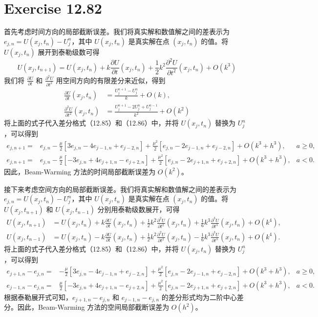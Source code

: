 \documentclass[twoside,a4paper]{article}
\begin{document}
\section{Exercise 12.82}
首先考虑时间方向的局部截断误差。我们将真实解和数值解之间的差表示为 $e_{j,n} = U(x_j, t_n) - U_j^n$，其中 $U(x_j, t_n)$ 是真实解在点 $(x_j, t_n)$ 的值。将 $U(x_j, t_n)$ 展开到泰勒级数可得
$$
U(x_j, t_{n+1}) = U(x_j, t_n) + k\frac{\partial U}{\partial t}(x_j,t_n) + \frac{1}{2}k^2\frac{\partial^2 U}{\partial t^2}(x_j, t_n) + O(k^3)
$$
我们将 $\frac{\partial U}{\partial t}$ 和 $\frac{\partial^2 U}{\partial t^2}$ 用空间方向的有限差分来近似，得到
$$
\begin{aligned}
\frac{\partial U}{\partial t}(x_j,t_n) &= \frac{U_{j}^{n+1} - U_{j}^{n}}{k} + O(k),\\
\frac{\partial^2 U}{\partial t^2}(x_j,t_n) &= \frac{U_{j}^{n+1} - 2U_j^n + U_j^{n-1}}{k^2} + O(k^2)
\end{aligned}
$$
将上面的式子代入差分格式（12.85）和（12.86）中，并将 $U(x_j, t_n)$ 替换为 $U_j^n$，可以得到
$$
\begin{aligned}
e_{j,n+1} =& e_{j,n} -\frac{\mu}{2}\left[3e_{j,n} - 4e_{j-1,n} + e_{j-2,n}\right] + \frac{\mu^2}{2}\left[e_{j,n} - 2e_{j-1,n} + e_{j-2,n}\right] + O(k^3 + h^3), & a\geq 0,\\
e_{j,n+1} =& e_{j,n} -\frac{\mu}{2}\left[-3e_{j,n} + 4e_{j+1,n} - e_{j+2,n}\right] + \frac{\mu^2}{2}\left[e_{j,n} - 2e_{j+1,n} + e_{j+2,n}\right] + O(k^3 + h^3), & a< 0.
\end{aligned}
$$
因此，Beam-Warming 方法的时间局部截断误差为 $O(k^2)$。

接下来考虑空间方向的局部截断误差。我们将真实解和数值解之间的差表示为 $e_{j,n} = U(x_j, t_n) - U_j^n$，其中 $U(x_j, t_n)$ 是真实解在点 $(x_j, t_n)$ 的值。将 $U(x_j, t_{n+1})$ 和 $U(x_j, t_{n-1})$ 分别用泰勒级数展开，可得
$$
\begin{aligned}
U(x_j, t_{n+1}) &= U(x_j, t_n) + k\frac{\partial U}{\partial t}(x_j,t_n) + \frac{1}{2}k^2\frac{\partial^2 U}{\partial t^2}(x_j, t_n) + \frac{1}{6}k^3\frac{\partial^3 U}{\partial t^3}(x_j, t_n) + O(k^4),\\
U(x_j, t_{n-1}) &= U(x_j, t_n) - k\frac{\partial U}{\partial t}(x_j,t_n) + \frac{1}{2}k^2\frac{\partial^2 U}{\partial t^2}(x_j, t_n) - \frac{1}{6}k^3\frac{\partial^3 U}{\partial t^3}(x_j, t_n) + O(k^4).
\end{aligned}
$$
将上面的式子代入差分格式（12.85）和（12.86）中，并将 $U(x_j, t_n)$ 替换为 $U_j^n$，可以得到
$$
\begin{aligned}
e_{j+1,n} - e_{j,n} =& -\frac{\mu}{2}\left[3e_{j,n} - 4e_{j-1,n} + e_{j-2,n}\right] + \frac{\mu^2}{2}\left[e_{j,n} - 2e_{j-1,n} + e_{j-2,n}\right] + O(k^3 + h^3), & a\geq 0,\\
e_{j-1,n} - e_{j,n} =& \frac{\mu}{2}\left[-3e_{j,n} + 4e_{j+1,n} - e_{j+2,n}\right] + \frac{\mu^2}{2}\left[e_{j,n} - 2e_{j+1,n} + e_{j+2,n}\right] + O(k^3 + h^3), & a< 0.
\end{aligned}
$$
根据泰勒展开式可知，$e_{j+1,n} - e_{j,n}$ 和 $e_{j-1,n} - e_{j,n}$ 的差分形式均为二阶中心差分。因此，Beam-Warming 方法的空间局部截断误差为 $O(h^2)$。
\end{document}
